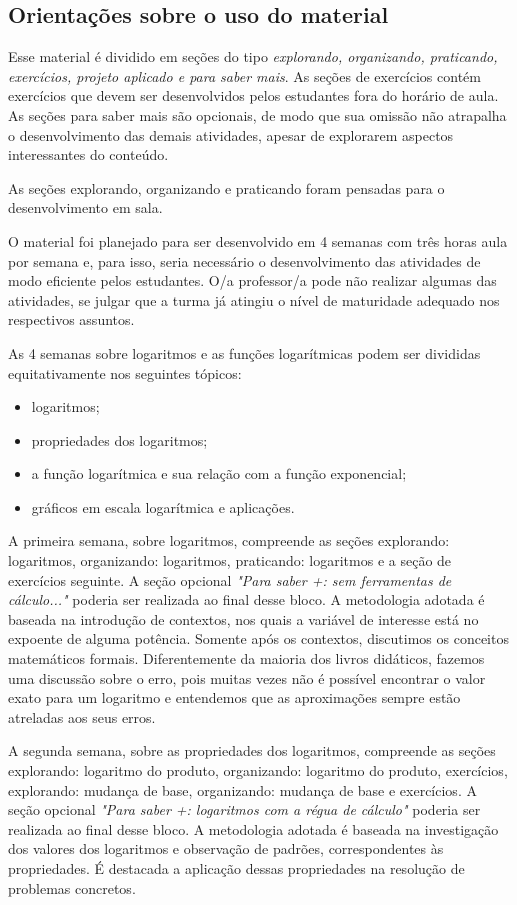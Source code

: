 \begin{apresentacao}
\section*{Orientações sobre o uso do material}

Esse material é dividido em seções do tipo \textit{explorando, organizando, praticando, exercícios, projeto aplicado e para saber mais}. As seções de exercícios contém exercícios que devem ser desenvolvidos pelos estudantes fora do horário de aula. As seções para saber mais são opcionais, de modo que sua omissão não atrapalha o desenvolvimento das demais atividades, apesar de explorarem aspectos interessantes do conteúdo.

As seções explorando, organizando e praticando foram pensadas para o desenvolvimento em sala.

O material foi planejado para ser desenvolvido em 4 semanas com três horas aula por semana e, para isso, seria necessário o desenvolvimento das atividades de modo eficiente pelos estudantes. O/a professor/a pode não realizar algumas das atividades, se julgar que a turma já atingiu o nível de maturidade adequado nos respectivos assuntos.

As 4 semanas sobre logaritmos e as funções logarítmicas podem ser divididas equitativamente nos seguintes tópicos:
\begin{itemize}
\item logaritmos;
\item propriedades dos logaritmos;
\item a função logarítmica e sua relação com a função exponencial;
\item gráficos em escala logarítmica e aplicações.
\end{itemize}

A primeira semana, sobre logaritmos, compreende as seções explorando: logaritmos, organizando: logaritmos, praticando: logaritmos e a seção de exercícios seguinte. A seção opcional \textit{"Para saber +: sem ferramentas de cálculo..."} poderia ser realizada ao final desse bloco. A metodologia adotada é baseada na introdução de contextos, nos quais a variável de interesse está no expoente de alguma potência. Somente após os contextos, discutimos os conceitos matemáticos formais. Diferentemente da maioria dos livros didáticos, fazemos uma discussão sobre o erro, pois muitas vezes não é possível encontrar o valor exato para um logaritmo e entendemos que as aproximações sempre estão atreladas aos seus erros.

A segunda semana, sobre as propriedades dos logaritmos, compreende as seções explorando: logaritmo do produto, organizando: logaritmo do produto, exercícios, explorando: mudança de base, organizando: mudança de base e exercícios. A seção opcional \textit{"Para saber +: logaritmos com a régua de cálculo"} poderia ser realizada ao final desse bloco. A metodologia adotada é baseada na investigação dos valores dos logaritmos e observação de padrões, correspondentes às propriedades. É destacada a aplicação dessas propriedades na resolução de problemas concretos.


\end{apresentacao}
